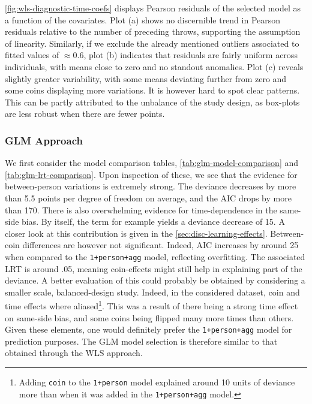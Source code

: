 \documentclass[a4paper, 12pt,oneside]{article}
\begin{document}
		\ref{fig:wls-diagnostic-time-coefs} displays Pearson residuals of the selected model as a function of the covariates.
		Plot (a) shows no discernible trend in Pearson residuals relative to the number of preceding throws, supporting the assumption of linearity.
		Similarly, if we exclude the already mentioned outliers associated to fitted values of $\approx 0.6$, plot (b) indicates that residuals are fairly uniform across individuals, with means close to zero and no standout anomalies. Plot (c) reveals slightly greater variability, with some means deviating further from zero and some coins displaying more variations. It is however hard to spot clear patterns. This can be partly attributed to the unbalance of the study design, as box-plots are less robust when there are fewer points.
		\subsubsection{GLM Approach}
			We first consider the model comparison tables, \ref{tab:glm-model-comparison} and \ref{tab:glm-lrt-comparison}. 
			Upon inspection of these, we see that the evidence for between-person variations is extremely strong. The deviance decreases by more than 5.5 points per degree of freedom on average, and the AIC drops by more than 170. There is also overwhelming evidence for time-dependence in the same-side bias. By itself, the term for example yields a deviance decrease of 15. A closer look at this contribution is given in the \ref{sec:disc-learning-effects}. 
			Between-coin differences are however not significant. Indeed, AIC increases by around 25 when compared to the \texttt{1+person+agg} model, reflecting overfitting. The associated LRT is around .05, meaning coin-effects might still help in explaining part of the deviance. A better evaluation of this could probably be obtained by considering a smaller scale, balanced-design study. Indeed, in the considered dataset, coin and time effects where aliased\footnote{Adding \texttt{coin} to the \texttt{1+person} model explained around 10 units of deviance more than when it was added in the \texttt{1+person+agg} model.}. This was a result of there being a strong time effect on same-side bias, and some coins being flipped many more times than others. 
			Given these elements, one would definitely prefer the \texttt{1+person+agg} model for prediction purposes.  
			The GLM model selection is therefore similar to that obtained through the WLS approach. 
\end{document}
